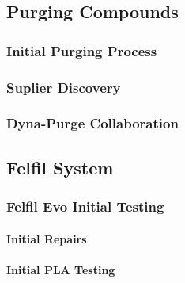 
\subsection{Purging Compounds\label{sec:methedology:extrusion:purgingCompounds}}

\subsubsection{Initial Purging Process\label{sec:methedology:extrusion:purgingCompounds:initialProcess}}

\subsubsection{Suplier Discovery\label{sec:methedology:extrusion:purgingCompounds:supplierDiscovery}}

\subsubsection{Dyna-Purge Collaboration\label{sec:methedology:extrusion:purgingCompounds:dynaPurgeCollaboration}}

\subsection{Felfil System\label{sec:methedology:extrusion:felfilSystem}}

\subsubsection{Felfil Evo Initial Testing\label{sec:methedology:extrusion:felfilSystem:felfilEvo}}

\paragraph*{Initial Repairs\label{sec:methedology:extrusion:felfilSystem:felfilEvo:initialRepairs}}

\paragraph*{Initial PLA Testing\label{sec:methedology:extrusion:felfilSystem:felfilEvo:initialTesting}}

